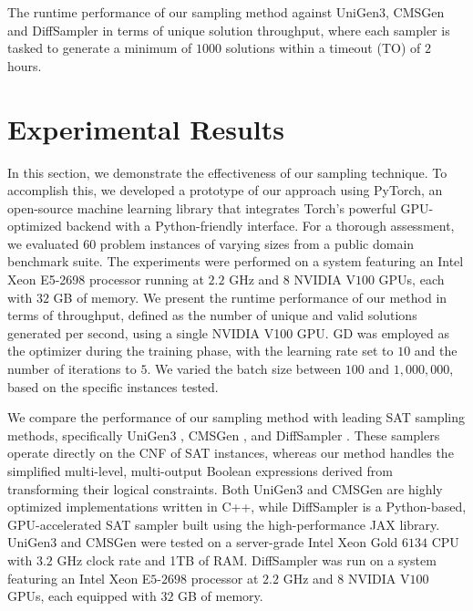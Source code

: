 \begin{table*}[]
    \caption{The runtime performance of our sampling method against {\sc UniGen3}, {\sc CMSGen} and {\sc DiffSampler} in terms of unique solution throughput, where each sampler is tasked to generate a minimum of $1000$ solutions within a timeout (TO) of $2$ hours.}
    \vspace{-0.2cm}
    \centering
    
    \label{tab2}
    \vspace{-0.5cm}
\end{table*}

\vspace{-0.2cm}
\section{Experimental Results}
In this section, we demonstrate the effectiveness of our sampling technique. To accomplish this, we developed a prototype of our approach using PyTorch, an open-source machine learning library that integrates Torch's powerful GPU-optimized backend with a Python-friendly interface. For a thorough assessment, we evaluated $60$ problem instances of varying sizes from a public domain benchmark suite. The experiments were performed on a system featuring an Intel Xeon E5-2698 processor running at $2.2$ GHz and $8$ NVIDIA V$100$ GPUs, each with $32$ GB of memory. We present the runtime performance of our method in terms of throughput, defined as the number of unique and valid solutions generated per second, using a single NVIDIA V1$00$ GPU. GD was employed as the optimizer during the training phase, with the learning rate set to $10$ and the number of iterations to $5$. We varied the batch size between $100$ and $1,000,000$, based on the specific instances tested.

We compare the performance of our sampling method with leading SAT sampling methods, specifically {\sc UniGen3} \cite{Soos2020unigen3}, {\sc CMSGen} \cite{Golia2021cmsgen}, and {\sc DiffSampler} \cite{Ardakani2024diffsampler}. These samplers operate directly on the CNF of SAT instances, whereas our method handles the simplified multi-level, multi-output Boolean expressions derived from transforming their logical constraints. Both {\sc UniGen3} and {\sc CMSGen} are highly optimized implementations written in C++, while {\sc DiffSampler} is a Python-based, GPU-accelerated SAT sampler built using the high-performance JAX library. {\sc UniGen3} and {\sc CMSGen} were tested on a server-grade Intel Xeon Gold $6134$ CPU with $3.2$ GHz clock rate and 1TB of RAM. {\sc DiffSampler} was run on a system featuring an Intel Xeon E$5$-$2698$ processor at $2.2$ GHz and $8$ NVIDIA V$100$ GPUs, each equipped with $32$ GB of memory.

